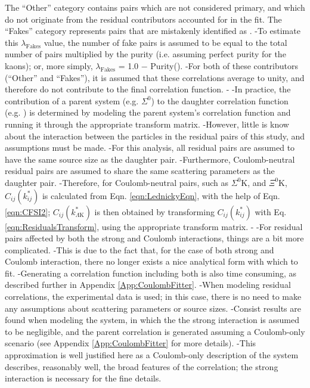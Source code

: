 \begin{table}[htbp]
\begin{table}[htbp]
 The ``Other'' category contains pairs which are not considered primary, and which do not originate from the residual contributors accounted for in the fit.  
 The ``Fakes'' category represents pairs that are mistakenly identified as \LamK.  
-To estimate this $\lambda_{\mathrm{Fakes}}$ value, the number of fake pairs is assumed to be equal to the total number of pairs multiplied by the \Lam purity (i.e. assuming perfect purity for the kaons); or, more simply, $\lambda_{\mathrm{Fakes}}$ = 1.0 $-$ Purity(\Lam).  
-For both of these contributors (``Other'' and ``Fakes''), it is assumed that these correlations average to unity, and therefore do not contribute to the final correlation function.
-
-In practice, the contribution of a parent system (e.g. $\Sigma^{0}$\KchP) to the daughter correlation function (e.g. \LamKchP) is determined by modeling the parent system's correlation function and running it through the appropriate transform matrix.
-However, little is know about the interaction between the particles in the residual pairs of this study, and assumptions must be made.
-For this analysis, all residual pairs are assumed to have the same source size as the daughter pair.
-Furthermore, Coulomb-neutral residual pairs are assumed to share the same scattering parameters as the daughter pair.
-Therefore, for Coulomb-neutral pairs, such as $\Sigma^{0}$K, and $\Xi^{0}$K, $C_{ij}(k^{*}_{ij})$ is calculated from Eqn. \ref{eqn:LednickyEqn}, with the help of Eqn. \ref{eqn:CFSI2}; $C_{ij}(k^{*}_{\Lambda\mathrm{K}})$ is then obtained by transforming $C_{ij}(k^{*}_{ij})$ with Eq. \ref{eqn:ResidualsTransform}, using the appropriate transform matrix.  
-
-For residual pairs affected by both the strong and Coulomb interactions, things are a bit more complicated.
-This is due to the fact that, for the case of both strong and Coulomb interaction, there no longer exists a nice analytical form with which to fit.
-Generating a correlation function including both is also time consuming, as described further in Appendix \ref{App:CoulombFitter}.
-When modeling \XiKpm residual correlations, the experimental \XiKpm data is used; in this case, there is no need to make any assumptions about scattering parameters or source sizes. 
-Consist results are found when modeling the \XiKpm system, in which the the strong interaction is assumed to be negligible, and the parent correlation is generated assuming a Coulomb-only scenario (see Appendix \ref{App:CoulombFitter} for more details).
-This approximation is well justified here as a Coulomb-only description of the system describes, reasonably well, the broad features of the correlation; the strong interaction is necessary for the fine details.  

\end{table}
\end{table}
